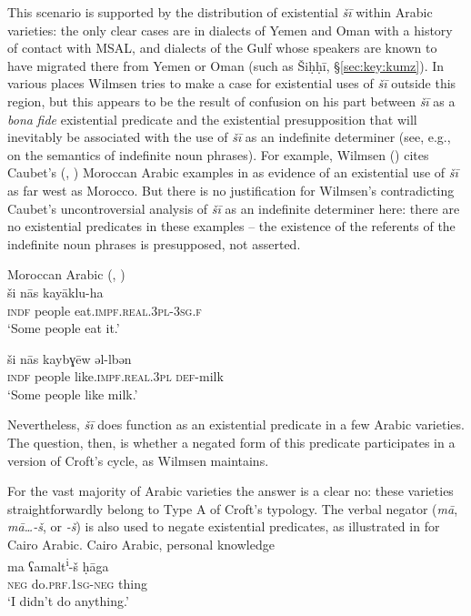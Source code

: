 \documentclass[output=paper]{langsci/langscibook}
\begin{document}
This scenario is supported by the distribution of existential \textit{šī} within Arabic varieties: the only clear cases are in dialects of Yemen and Oman with a history of contact with MSAL, and dialects of the Gulf whose speakers are known to have migrated there from Yemen or Oman (such as Šiḥḥī, §\ref{sec:key:kumz}). In various places Wilmsen tries to make a case for existential uses of \textit{šī} outside this region, but this appears to be the result of confusion on his part between \textit{šī} as a \textit{bona} \textit{fide} existential predicate and the existential presupposition that will inevitably be associated with the use of \textit{šī} as an indefinite determiner (see, e.g., \citealt{Heim1988} on the semantics of indefinite noun phrases). For example, Wilmsen (\citeyear[123]{Wilmsen2014}) cites Caubet’s (\citeyear[123]{Caubet1993a}, \citeyear[280]{Caubet1993b}) Moroccan Arabic examples in  as evidence of an existential use of \textit{šī} as far west as Morocco. But there is no justification for Wilmsen’s contradicting Caubet’s uncontroversial analysis of \textit{šī} as an indefinite determiner here: there are no existential predicates in these examples – the existence of the referents of the indefinite noun phrases is presupposed, not asserted.

\ea\label{mor}
{Moroccan Arabic (\citealt[123]{Caubet1993a}, \citealt[280]{Caubet1993b})}\\
\ea\gll ši nās kayāklu-ha\\
     \textsc{indf} people eat.\textsc{impf.real.3pl-3sg.f}  \\
\glt ‘Some people eat it.’

\ex
\gll ši nās kaybɣēw əl-lbən\\
     \textsc{indf} people like.\textsc{impf.real.3pl} \textsc{def-}milk\\
\glt  ‘Some people like milk.’
\z
\z

Nevertheless, \textit{šī} does function as an existential predicate in a few Arabic varieties. The question, then, is whether a negated form of this predicate participates in a version of Croft’s cycle, as Wilmsen maintains.

For the vast majority of Arabic varieties the answer is a clear no: these varieties straightforwardly belong to Type A of Croft’s typology. The verbal negator (\textit{mā}, \textit{mā…-š}, or \textit{{}-š}) is also used to negate existential predicates, as illustrated in  for Cairo Arabic. 
\newpage
\ea\label{cair}
{Cairo Arabic, personal knowledge} \\
\ea\gll ma ʕamalt\textsuperscript{i}{}-š ḥāga\\
     \textsc{neg} do.\textsc{prf.1sg-neg} thing  \\
\glt ‘I didn’t do anything.’
\end{document}
